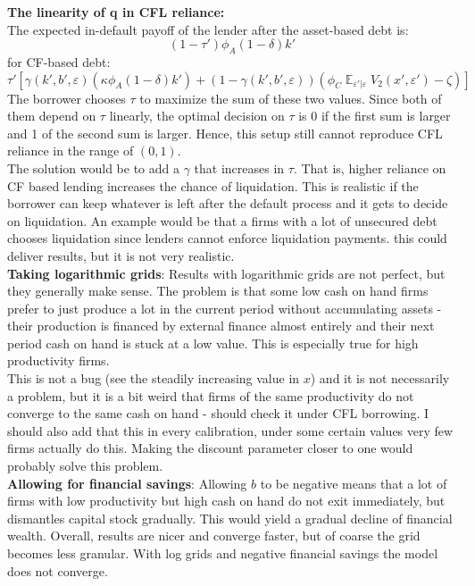 \documentclass[12pt]{article}
\DeclareMathOperator{\E}{\mathbb{E}}
\begin{document}
\textbf{The linearity of q in CFL reliance:} \\
The expected in-default payoff of the lender after the asset-based debt is: 
$$  (1-\tau') \phi_A (1-\delta) k'  $$
for CF-based debt: 
$$    \tau'\left[\gamma(k',b',\varepsilon)(\kappa \phi_A  (1-\delta) k') +  (1-\gamma(k',b',\varepsilon))\left( \phi_C \E_{\varepsilon'|\varepsilon}V_2 (x', \varepsilon') - \zeta \right) \right] $$
The borrower chooses $\tau$ to maximize the sum of these two values. Since both of them depend on $\tau$ linearly, the optimal decision on $\tau$ is 0 if the first sum is larger and 1 of the second sum is larger. Hence, this setup still cannot reproduce CFL reliance in the range of $(0,1)$. \vspace{3mm} \\
The solution would be to add a $\gamma$ that increases in $\tau$. That is, higher reliance on CF based lending increases the chance of liquidation. This is realistic if the borrower can keep whatever is left after the default process and it gets to decide on liquidation. An example would be that a firms with a lot of unsecured debt chooses liquidation since lenders cannot enforce liquidation payments. this could deliver results, but it is not very realistic. \vspace{3mm} \\
\textbf{Taking logarithmic grids}: Results with logarithmic grids are not perfect, but they generally make sense. The problem is that some low cash on hand firms prefer to just produce a lot in the current period without accumulating assets - their production is financed by external finance almost entirely and their next period cash on hand is stuck at a low value.  This is especially true for high productivity firms. \vspace{3mm} \\
 This is not a bug (see the steadily increasing value in $x$) and it is not necessarily a problem, but it is a bit weird that firms of the same productivity do not converge to the same cash on hand - should check it under CFL borrowing. I should also add that this in every calibration, under some certain values very few firms actually do this. Making the discount parameter closer to one would probably solve this problem.   \vspace{3mm} \\
\textbf{Allowing for financial savings}:  Allowing $b$ to be negative means that a lot of firms with low productivity but high cash on hand do not exit immediately, but dismantles capital stock gradually. This would yield a gradual decline of financial wealth. Overall, results are nicer and converge faster, but of coarse the grid becomes less granular. With log grids and negative financial savings the model does not converge.  \vspace{3mm} \\
\end{document}
